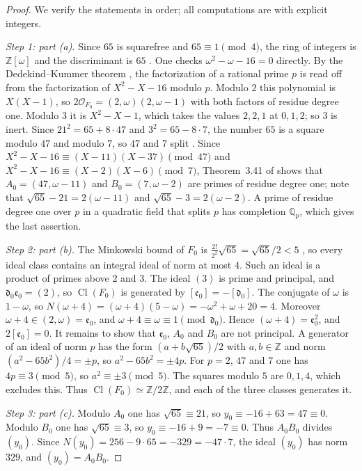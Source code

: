 \documentclass[11pt]{article}
\theoremstyle{plain}
\theoremstyle{definition}
\theoremstyle{remark}
\DeclareMathOperator{\Cl}{Cl}
\newcommand{\Z}{\mathbb Z}
\newcommand{\Q}{\mathbb Q}
\newcommand{\OO}{\mathcal O}
\begin{document}
\begin{proof}
We verify the statements in order; all computations are with explicit
integers.

\emph{Step 1: part (a).}  Since $65$ is squarefree and
$65\equiv1\pmod4$, the ring of integers is $\Z[\omega]$ and the
discriminant is $65$ \cite[Example~2.41]{MilneANT}.  One checks
$\omega^2-\omega-16=0$ directly.  By the Dedekind--Kummer theorem
\cite[Theorem~3.41]{MilneANT}, the factorization of a rational prime $p$
is read off from the factorization of $X^2-X-16$ modulo $p$.  Modulo $2$
this polynomial is $X(X-1)$, so $2\OO_{F_0}=(2,\omega)(2,\omega-1)$ with
both factors of residue degree one.  Modulo $3$ it is $X^2-X-1$, which
takes the values $2,2,1$ at $0,1,2$; so $3$ is inert.  Since
$21^2=65+8\cdot47$ and $3^2=65-8\cdot7$, the number $65$ is a square
modulo $47$ and modulo $7$, so $47$ and $7$ split
\cite[Example~3.44]{MilneANT}.  Since
$X^2-X-16\equiv(X-11)(X-37)\pmod{47}$ and $X^2-X-16\equiv(X-2)(X-6)\pmod7$,
Theorem~3.41 of \cite{MilneANT} shows that $A_0=(47,\omega-11)$ and
$B_0=(7,\omega-2)$ are primes of residue degree one; note that
$\sqrt{65}-21=2(\omega-11)$ and $\sqrt{65}-3=2(\omega-2)$.
A prime of residue degree one over $p$ in a quadratic field that splits
$p$ has completion $\Q_p$, which gives the last assertion.

\emph{Step 2: part (b).}  The Minkowski bound of $F_0$ is
$\frac{2!}{2^2}\sqrt{65}=\sqrt{65}/2<5$ \cite[Theorem~4.3]{MilneANT}, so
every ideal class contains an integral ideal of norm at most $4$.  Such an
ideal is a product of primes above $2$ and $3$.  The ideal $(3)$ is prime
and principal, and $\mathfrak d_0\mathfrak e_0=(2)$, so $\Cl(F_0)$ is
generated by $[\mathfrak e_0]=-[\mathfrak d_0]$.  The conjugate of $\omega$
is $1-\omega$, so $N(\omega+4)=(\omega+4)(5-\omega)=-\omega^2+\omega+20=4$.
Moreover $\omega+4\in(2,\omega)=\mathfrak e_0$, and
$\omega+4\equiv\omega\equiv1\pmod{\mathfrak d_0}$.  Hence
$(\omega+4)=\mathfrak e_0^2$, and $2[\mathfrak e_0]=0$.  It remains to show
that $\mathfrak e_0$, $A_0$ and $B_0$ are not principal.  A generator of an
ideal of norm $p$ has the form $(a+b\sqrt{65})/2$ with $a,b\in\Z$ and norm
$(a^2-65b^2)/4=\pm p$, so $a^2-65b^2=\pm4p$.  For $p=2$, $47$ and $7$ one
has $4p\equiv3\pmod5$, so $a^2\equiv\pm3\pmod5$.  The squares modulo $5$
are $0,1,4$, which excludes this.  Thus $\Cl(F_0)\simeq\Z/2\Z$, and each of
the three classes generates it.

\emph{Step 3: part (c).}  Modulo $A_0$ one has $\sqrt{65}\equiv21$, so
$y_0\equiv-16+63=47\equiv0$.  Modulo $B_0$ one has $\sqrt{65}\equiv3$, so
$y_0\equiv-16+9=-7\equiv0$.  Thus $A_0B_0$ divides $(y_0)$.  Since
$N(y_0)=256-9\cdot65=-329=-47\cdot7$, the ideal $(y_0)$ has norm $329$,
and $(y_0)=A_0B_0$.


\end{proof}
\end{document}
